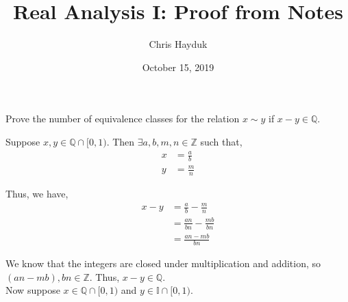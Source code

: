 \documentclass[12pt]{article}
\newenvironment{problem}[2][Problem]{\begin{trivlist}
\item[\hskip \labelsep {\bfseries #1}\hskip \labelsep {\bfseries #2.}]}{\end{trivlist}}
\begin{document}
\title{Real Analysis I: Proof from Notes}

\author{Chris Hayduk}
\date{October 15, 2019}

\maketitle

\begin{problem}{1} Prove the number of equivalence classes for the relation $x \sim y$ if $x - y \in \mathbb{Q}$.
\end{problem}

Suppose $x, y \in \mathbb{Q} \cap [0, 1)$. Then $\exists a, b, m, n \in \mathbb{Z}$ such that,
\begin{align*}
x &= \frac{a}{b}\\
y &= \frac{m}{n}
\end{align*}

Thus, we have,
\begin{align*}
x - y &= \frac{a}{b} - \frac{m}{n}\\
&= \frac{an}{bn} - \frac{mb}{bn}\\
&= \frac{an - mb}{bn}
\end{align*}

We know that the integers are closed under multiplication and addition, so $(an - mb), bn \in \mathbb{Z}$. Thus, $x - y \in \mathbb{Q}$.\\

Now suppose $x \in \mathbb{Q} \cap [0, 1)$ and $y \in \mathbb{I} \cap [0, 1)$.
\end{document}
